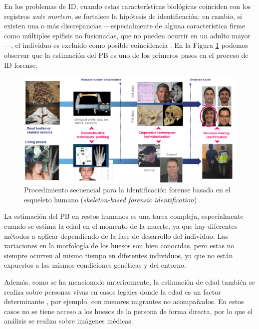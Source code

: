 En los problemas de ID, cuando estas características biológicas coinciden con los registros \textit{ante mortem}, se fortalece la hipótesis de identificación; en cambio, si existen una o más discrepancias ---especialmente de alguna característica firme como múltiples epífisis no fusionadas, que no pueden ocurrir en un adulto mayor---, el individuo es excluido como posible coincidencia \cite{byers2023}. En la Figura \ref{fig:SFI_pipeline} podemos observar que la estimación del PB es uno de los primeros pasos en el proceso de ID forense. 

\begin{figure}[h]
    \centering
    \includegraphics[width=\textwidth]{capitulos/cap_01/imagenes/SFI_pipeline.png}
    \caption{Procedimiento secuencial para la identificación forense basada en el esqueleto humano (\textit{skeleton-based forensic identification}) \cite{mesejo2020}.} 
    \label{fig:SFI_pipeline}
\end{figure}

La estimación del PB en restos humanos es una tarea compleja, especialmente cuando se estima la edad en el momento de la muerte, ya que hay diferentes métodos a aplicar dependiendo de la fase de desarrollo del individuo. Las variaciones en la morfología de los huesos son bien conocidas, pero estas no siempre ocurren al mismo tiempo en diferentes individuos, ya que no están expuestos a las mismos condiciones genéticas y del entorno.

Además, como se ha mencionado anteriormente, la estimación de edad también se realiza sobre personas vivas en casos legales donde la edad es un factor determinante \cite{schmeling2016}, por ejemplo, con menores migrantes no acompañados. En estos casos no se tiene acceso a los huesos de la persona de forma directa, por lo que el análisis se realiza sobre imágenes médicas.


